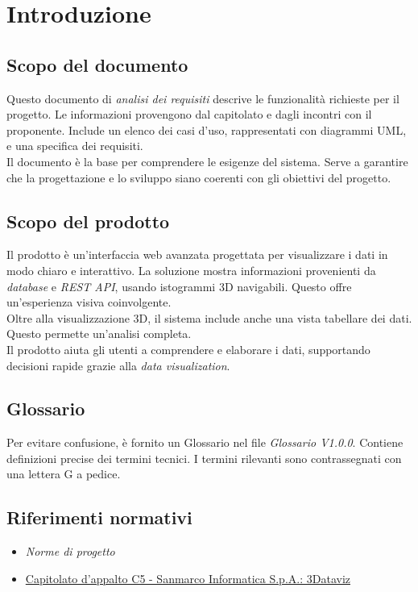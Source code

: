 \section{Introduzione}
\subsection{Scopo del documento}
Questo documento di \textit{analisi dei requisiti} descrive le funzionalità richieste per il progetto. Le informazioni provengono dal capitolato e dagli incontri con il proponente. Include un elenco dei casi d'uso, rappresentati con diagrammi UML, e una specifica dei requisiti.\\
Il documento è la base per comprendere le esigenze del sistema. Serve a garantire che la progettazione e lo sviluppo siano coerenti con gli obiettivi del progetto.

\subsection{Scopo del prodotto}
Il prodotto è un'interfaccia web avanzata progettata per visualizzare i dati in modo chiaro e interattivo.
La soluzione mostra informazioni provenienti da \textit{database} e \textit{REST API}, usando istogrammi 3D navigabili. Questo offre un'esperienza visiva coinvolgente.\\
Oltre alla visualizzazione 3D, il sistema include anche una vista tabellare dei dati. Questo permette un'analisi completa.\\
Il prodotto aiuta gli utenti a comprendere e elaborare i dati, supportando decisioni rapide grazie alla \textit{data visualization}.

\subsection{Glossario}
Per evitare confusione, è fornito un Glossario nel file \textit{Glossario V1.0.0}. Contiene definizioni precise dei termini tecnici. I termini rilevanti sono contrassegnati con una lettera G a pedice.

\subsection{Riferimenti normativi}
\begin{itemize}
      \item {\textit{Norme di progetto}}
      \item \href{https://www.math.unipd.it/~tullio/IS-1/2024/Progetto/C5.pdf}
            {Capitolato d'appalto C5 - Sanmarco Informatica S.p.A.: 3Dataviz}
\end{itemize}


